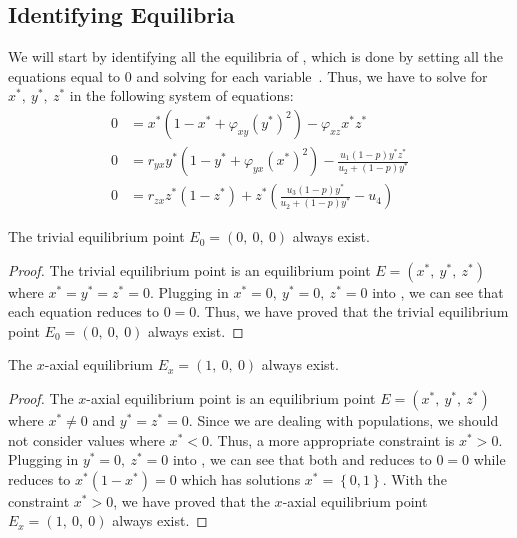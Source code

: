 \subsection{Identifying Equilibria}\label{subsec:identifying-equilibria}
We will start by identifying all the equilibria of , which is done by setting all the equations equal to 0 and solving for each variable~\cite{Strogatz9780813349107}.
Thus, we have to solve for $x^*,\ y^*,\ z^*$ in the following system of equations:
\begin{subequations}\label{system:model-0}
    \begin{align}
        0 &= x^*\left(1-x^*+\varphi_{xy}\left(y^*\right)^2\right)-\varphi_{xz}x^*z^* \label{eq:model-0-x}\\
        0 &= r_{yx}y^*\left(1-y^*+\varphi_{yx}\left(x^*\right)^2\right)-\frac{u_1\left(1-p\right)y^*z^*}{u_2+\left(1-p\right)y^*} \label{eq:model-0-y}\\
        0 &= r_{zx}z^*\left(1-z^*\right)+z^*\left(\frac{u_3\left(1-p\right)y^*}{u_2+\left(1-p\right)y^*}-u_4\right) \label{eq:model-0-z}
    \end{align}
\end{subequations}
\begin{theorem}\label{thm:trivial-exist}
    The trivial equilibrium point $E_0=\left(0,\ 0,\ 0\right)$ always exist.
\end{theorem}
\begin{proof}
    The trivial equilibrium point is an equilibrium point $E=\left(x^*,\ y^*,\ z^*\right)$ where $x^*=y^*=z^*=0$.
    Plugging in $x^*=0,\ y^*=0,\ z^*=0$ into , we can see that each equation reduces to $0=0$.
    Thus, we have proved that the trivial equilibrium point $E_0=\left(0,\ 0,\ 0\right)$ always exist.
\end{proof}
\begin{theorem}\label{thm:axial-x-exist}
    The $x$-axial equilibrium $E_x=\left(1,\ 0,\ 0\right)$ always exist.
\end{theorem}
\begin{proof}
    The $x$-axial equilibrium point is an equilibrium point $E=\left(x^*,\ y^*,\ z^*\right)$ where $x^*\neq0$ and $y^*=z^*=0$.
    Since we are dealing with populations, we should not consider values where $x^*<0$.
    Thus, a more appropriate constraint is $x^*>0$.
    Plugging in $y^*=0,\ z^*=0$ into , we can see that both  and  reduces to $0=0$ while  reduces to $x^*\left(1-x^*\right)=0$ which has solutions $x^*=\left\{0,1\right\}$.
    With the constraint $x^*>0$, we have proved that the $x$-axial equilibrium point $E_x=\left(1,\ 0,\ 0\right)$ always exist.
\end{proof}
